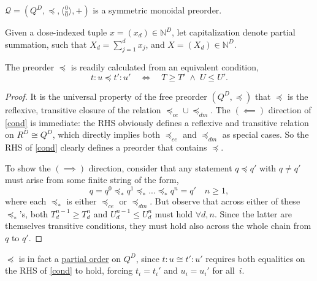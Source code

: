 \documentclass{article}
\newcommand{\N}{\mathbb{N}}
\begin{document}
\begin{fact}\label{symon}
  $\mathcal{Q} = (Q^D,\preceq,\langle\frac{0}{0}\rangle,+)$ is a symmetric monoidal preorder.
\end{fact}

\begin{nota}
  Given a dose-indexed tuple $x = (x_d) \in \N^D$, let capitalization denote partial summation, such that $X_d = \sum_{j=1}^d x_j$, and $X = (X_d) \in \N^D$.
\end{nota}

\begin{fact}
  The preorder $\preceq$ is readily calculated from an equivalent condition,
  \begin{equation}
  t\!:\!u \preceq t'\!:\!u' \quad\iff\quad T \ge T' \;\wedge\; U \le U'.\label{cond}
  \end{equation}
\end{fact}
\begin{proof}
  It is the universal property of the free preorder $(Q^D, \preceq)$ that $\preceq$ is the reflexive, transitive closure of the relation $\preceq_{ce} \cup \preceq_{dm}$.  The $(\!\impliedby\!)$ direction of \eqref{cond} is immediate: the RHS obviously defines a reflexive and transitive relation on $R^D \cong Q^D$, which directly implies both $\preceq_{ce}$ and $\preceq_{dm}$ as special cases.  So the RHS of \eqref{cond} clearly defines a preorder that contains $\preceq$.

  To show the $(\!\implies\!)$ direction, consider that any statement $q \preceq q'$ with $q \neq q'$ must arise from some finite string of the form,
  \begin{equation}
  q = q^0 \preceq_* q^1 \preceq_* ... \preceq_* q^n = q' \quad n \ge 1, \label{string}
  \end{equation}
  where each $\preceq_*$ is either $\preceq_{ce}$ or $\preceq_{dm}$.  But observe that across either of these $\preceq_*$'s, both $T_d^{n-1} \ge T_d^n$ and $U_d^{n-1} \le U_d^n$ must hold $\forall d, n$.  Since the latter are themselves transitive conditions, they must hold also across the whole chain from $q$ to $q'$.  
\end{proof}

\begin{corr}\label{partord}
  $\preceq$ is in fact a \underline{partial order} on $Q^D$, since $t\!:\!u \cong t'\!:\!u'$ requires both equalities on the RHS of \eqref{cond} to hold, forcing $t_i = t_i'$ and $u_i = u_i'$ for all $\,i$.
\end{corr}
\end{document}
